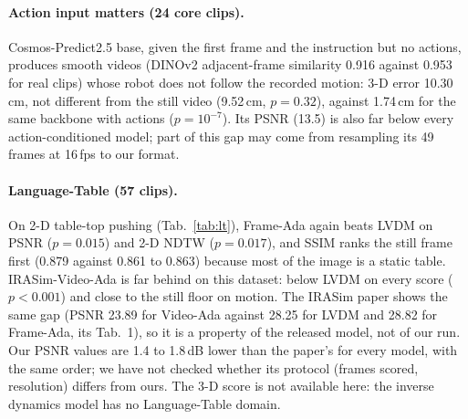 \paragraph{Action input matters (24 core clips).}
Cosmos-Predict2.5 base, given the first frame and the instruction but no actions, produces smooth videos (DINOv2 adjacent-frame similarity 0.916 against 0.953 for real clips) whose robot does not follow the recorded motion: 3-D error 10.30\,cm, not different from the still video (9.52\,cm, $p=0.32$), against 1.74\,cm for the same backbone with actions ($p=10^{-7}$).
Its PSNR (13.5) is also far below every action-conditioned model; part of this gap may come from resampling its 49 frames at 16\,fps to our format.

\paragraph{Language-Table (57 clips).}
On 2-D table-top pushing (Tab.~\ref{tab:lt}), Frame-Ada again beats LVDM on PSNR ($p=0.015$) and 2-D NDTW ($p=0.017$), and SSIM ranks the still frame first (0.879 against 0.861 to 0.863) because most of the image is a static table.
IRASim-Video-Ada is far behind on this dataset: below LVDM on every score ($p<0.001$) and close to the still floor on motion.
The IRASim paper shows the same gap (PSNR 23.89 for Video-Ada against 28.25 for LVDM and 28.82 for Frame-Ada, its Tab.~1), so it is a property of the released model, not of our run.
Our PSNR values are 1.4 to 1.8\,dB lower than the paper's for every model, with the same order; we have not checked whether its protocol (frames scored, resolution) differs from ours.
The 3-D score is not available here: the inverse dynamics model has no Language-Table domain.

\begin{table}[t]
\centering
\footnotesize
\setlength{\tabcolsep}{2.5pt}
\caption{Language-Table, 57 clips. Columns as in Tab.~\ref{tab:bridge}; last column: PSNR reported in the IRASim paper \cite{zhu2024irasim} (Tab.~1). Best in bold, second underlined (still frame excluded).}
\label{tab:lt}
\end{table}
